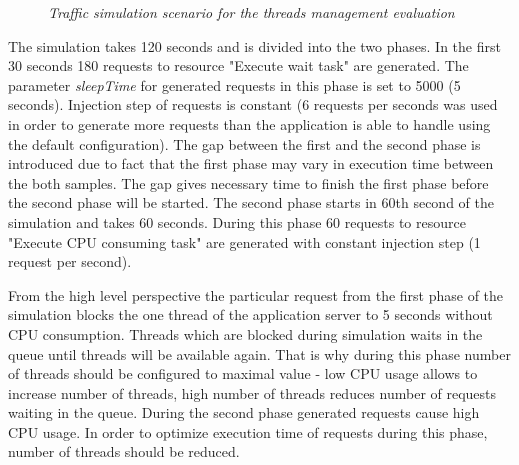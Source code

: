 \documentclass[12pt,a4paper]{article}
\begin{document}
\begin{figure}[!htb]
\begin{center}
\caption{\textit{Traffic simulation scenario for the threads management evaluation}} \label{figure:trafficthreads}
\end{center}
\end{figure}

The simulation takes 120 seconds and is divided into the two phases. In the first 30 seconds 180 requests to resource "Execute wait task" are generated. The parameter \textit{sleepTime} for generated requests in this phase is set to 5000 (5 seconds). Injection step of requests is constant (6 requests per seconds was used in order to generate more requests than the application is able to handle using the default configuration). The gap between the first and the second phase is introduced due to fact that the first phase may vary in execution time between the both samples. The gap gives necessary time to finish the first phase before the second phase will be started. The second phase starts in 60th second of the simulation and takes 60 seconds. During this phase 60 requests to resource "Execute CPU consuming task" are generated with constant injection step (1 request per second). 

From the high level perspective the particular request from the first phase of the simulation blocks the one thread of the application server to 5 seconds without CPU consumption. Threads which are blocked during simulation waits in the queue until threads will be available again. That is why during this phase number of threads should be configured to maximal value - low CPU usage allows to increase number of threads, high number of threads reduces number of requests waiting in the queue. During the second phase generated requests cause high CPU usage. In order to optimize execution time of requests during this phase, number of threads should be reduced.    
\end{document}
